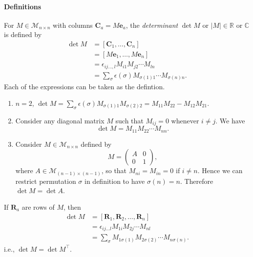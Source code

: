 \documentclass[a4paper]{article}
\begin{document}
    \paragraph{Definitions}
    \begin{definition}
      For $ M\in \mathcal{M}_{n\times n} $ with columns $
      \mathbf{C}_a=M\mathbf{e}_a $, the \textit{determinant} $ \det M
      $ or $ |M|\in \mathbb{R} \text{ or }\mathbb{C}  $ is defined by
      \[
        \begin{aligned}
          \det M&= [\mathbf{C}_1,\dots,\mathbf{C}_n]\\
          &=[M\mathbf{e}_1,\dots,M\mathbf{e}_n]\\
          &= \epsilon_{ij\dots,l}M_{i1}M_{j2}\cdots M_{ln}\\
          &= \sum_{\sigma}\epsilon(\sigma)M_{\sigma(1)1}\cdots M_{\sigma(n)n}.
        \end{aligned}
      \]
      Each of the expressions can be taken as the defintion.
    \end{definition}
    \begin{example}
      \begin{enumerate}
        \item $n=2$, $ \det M=
          \sum_{\sigma}\epsilon(\sigma)M_{\sigma(1)1}M_{\sigma(2)2}=M_{11}M_{22}-M_{12}M_{21}
          $.
        \item Consider any diagonal matrix $M$ such that $ M_{ij}=0 $
          whenever $ i\neq j $. We have
          \[
            \det M = M_{11}M_{22}\cdots M_{nn}
          .\]
        \item Consider $ M\in \mathcal{M}_{n\times n} $ defined by
          \[
            M=
            \begin{pmatrix}
              A&0\\
              0&1
            \end{pmatrix}
          ,\]
          where $A\in \mathcal{M}_{(n-1) \times (n-1)}$, so that $
          M_{ni}=M_{in}=0 $ if $i\neq n$. Hence we can restrict
          permutation $ \sigma $ in definition to have $ \sigma(n)=n
          $. Therefore $ \det M=\det A $.
      \end{enumerate}
    \end{example}
    \begin{proposition}
      If $ \mathbf{R}_a $ are rows of $M$, then
      \[
        \begin{aligned}
          \det M&=[\mathbf{R}_1,\mathbf{R}_2,\dots,\mathbf{R}_n]\\
          &= \epsilon_{ij\dots l}M_{1i}M_{2j}\cdots M_{nl}\\
          &= \sum_{\sigma}M_{1\sigma(1)}M_{2\sigma(2)}\cdots M_{n\sigma(n)}.
        \end{aligned}
      \]
      i.e., $ \det M = \det M^{\top} $.
    \end{proposition}
\end{document}
